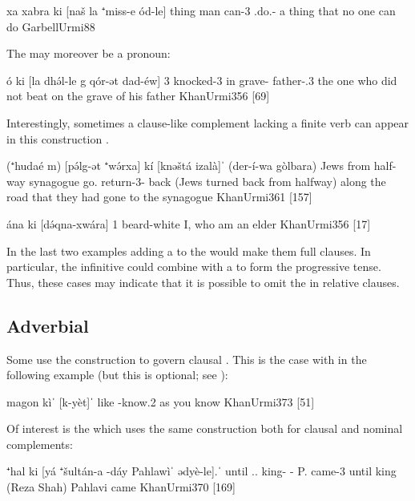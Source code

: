 {xa xabra ki [naš la ⁺miss-e ód-le]}
{\indef{} thing \rel{} man \neg{} can-3\masc{} \sbjv.do.\masc-\masc}
{a thing that no one can do}
{GarbellUrmi}{88}





The \prim may moreover be a pronoun:

{ó ki\cb{} [la dhə́l-le g\cb{} qór-ət dad-éw]}
{3\sg{} \rel\cb{} \neg{} knocked-3\masc{} in\cb{} grave-\cst{} father-\poss.3\masc}
{the one who did not beat on the grave of his father}
{KhanUrmi}{356 {[69]}}

Interestingly, sometimes a clause-like complement lacking a finite verb can appear in this construction \citep[361]{KhanUrmi}.

{(⁺hudaé m\cb{}) [pə́lg-ət ⁺wə́rxa] kí [knəštá izalà]ˈ (der-í-wa gòlbara)}
{Jews from\cb{} half-\cst{} way \rel{} synagogue go.\inf{} return-3\pl-\pst{} back}
{(Jews turned back from halfway) along the road that they had gone to the synagogue}
{KhanUrmi}{361 {[157]}}

{ána ki\cb{} [\parplus də́qna-xwára]} 
{1\sg{} \rel\cb{} \hphantom{[\parplus}beard-white}
{I, who am an elder}
{KhanUrmi}{356 {[17]}}

In the last two examples adding a  to the \secns would make them full clauses. In particular, the infinitive  could combine with a  to form the progressive tense. Thus, these cases may indicate that it is possible to omit the  in relative clauses.


\subsection{Adverbial \prims}
Some  \prims use the  construction to govern clausal \secns. This is the case with  in the following example (but this is optional; see ):

\largerpage
{}
{magon\cb{} kìˈ [k-yèt]ˈ}
{like\cb{} \rel{} \ind-know.2\masc}
{as you know}
{KhanUrmi}{373 {[51]}}\antipar



Of interest is the   which uses the same construction both for clausal and nominal complements:
\newpage 

{⁺hal\cb{} ki\cb{} [yá ⁺šultán-a -d\cb{}áy {Pahlawi}̀ˈ ədyè-le].ˈ}
{until\cb{} \rel\cb{} \dem.\near.\sg{} king-\cst{} -\cst\cb{}\lnk{} P. came-3\masc}
{until king (Reza Shah) Pahlavi came}
{KhanUrmi}{370 {[169]}}

